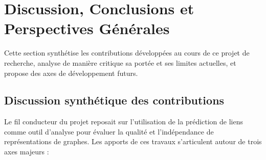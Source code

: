 

\section{Discussion, Conclusions et Perspectives Générales}
\label{sec:discussion_conclusion}

Cette section synthétise les contributions développées au cours de ce projet de recherche, analyse de manière critique sa portée et ses limites actuelles, et propose des axes de développement futurs.

\subsection{Discussion synthétique des contributions}

Le fil conducteur du projet reposait sur l'utilisation de la prédiction de liens comme outil d'analyse pour évaluer la qualité et l'indépendance de représentations de graphes. Les apports de ces travaux s'articulent autour de trois axes majeurs :

